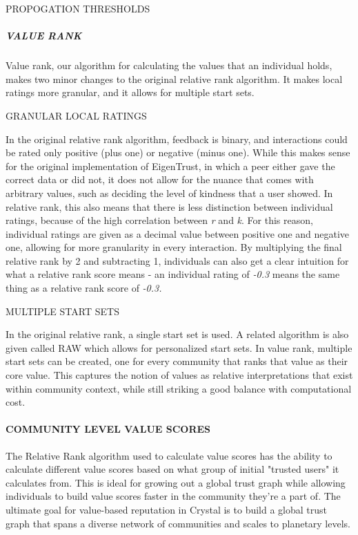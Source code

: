 PROPOGATION THRESHOLDS

\subparagraph{VALUE RANK }\label{value-rank}

Value rank, our algorithm for calculating the values that an individual
holds, makes two minor changes to the original relative rank algorithm.
It makes local ratings more granular, and it allows for multiple start
sets.

GRANULAR LOCAL RATINGS

In the original relative rank algorithm, feedback is binary, and
interactions could be rated only positive (plus one) or negative (minus
one). While this makes sense for the original implementation of
EigenTrust, in which a peer either gave the correct data or did not, it
does not allow for the nuance that comes with arbitrary values, such as
deciding the level of kindness that a user showed. In relative rank,
this also means that there is less distinction between individual
ratings, because of the high correlation between \emph{r} and \emph{k}.
For this reason, individual ratings are given as a decimal value between
positive one and negative one, allowing for more granularity in every
interaction. By multiplying the final relative rank by 2 and subtracting
1, individuals can also get a clear intuition for what a relative rank
score means - an individual rating of \emph{-0.3} means the same thing
as a relative rank score of \emph{-0.3.}

MULTIPLE START SETS

In the original relative rank, a single start set is used. A related
algorithm is also given called RAW which allows for personalized start
sets. In value rank, multiple start sets can be created, one for every
community that ranks that value as their core value. This captures the
notion of values as relative interpretations that exist within community
context, while still striking a good balance with computational cost.

\paragraph{COMMUNITY LEVEL VALUE
SCORES}\label{community-level-value-scores}

The Relative Rank algorithm used to calculate value scores has the
ability to calculate different value scores based on what group of
initial "trusted users" it calculates from. This is ideal for growing
out a global trust graph while allowing individuals to build value
scores faster in the community they're a part of. The ultimate goal for
value-based reputation in Crystal is to build a global trust graph that
spans a diverse network of communities and scales to planetary levels.

